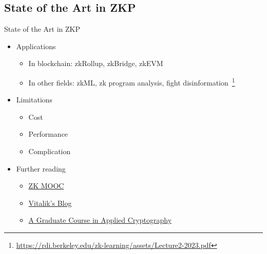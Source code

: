 \documentclass{beamer}
\begin{document}
  \subsection{State of the Art in ZKP}

  \begin{frame}{State of the Art in ZKP}
    \begin{itemize}
      \item Applications
      \begin{itemize}
        \item In blockchain: zkRollup, zkBridge, zkEVM
        \item In other fields: zkML, zk program analysis, fight disinformation~\footnote{\url{https://rdi.berkeley.edu/zk-learning/assets/Lecture2-2023.pdf}}
      \end{itemize}
      \item Limitations
        \begin{itemize}
          \item Cost
          \item Performance
          \item Complication
        \end{itemize}
      \item Further reading
        \begin{itemize}
          \item \href{https://rdi.berkeley.edu/zk-learning/}{ZK MOOC}
          \item \href{https://vitalik.eth.limo/general/2019/09/22/plonk.html}{Vitalik's Blog}
          \item \href{https://toc.cryptobook.us/}{A Graduate Course in Applied Cryptography}
        \end{itemize}
    \end{itemize}
  
  \end{frame}
\end{document}
